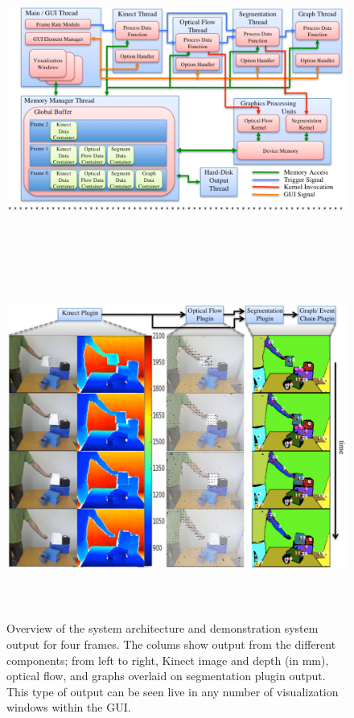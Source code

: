 \begin{figure}
\begin{center}
\includegraphics[width=165mm,height=100mm]{SystemFlowColor.pdf}
\includegraphics[width=170mm,height=112mm]{SystemOutput.pdf}
\end{center}
  \caption[Overview of the system architecture]{Overview of the system architecture and demonstration system output for four frames. The colums show output from the different components; from left to right, Kinect image and depth (in mm), optical flow, and graphs overlaid on segmentation plugin output. This type of output can be seen live in any number of visualization windows within the GUI.}
\label{fig:SystemArchitecture}
\end{figure}

